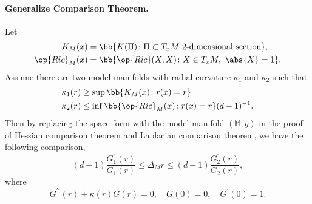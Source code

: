\paragraph{Generalize Comparison Theorem.} Let
\begin{align*}
    K_M(x) &= \bb{K(\Pi) \colon \Pi \subset T_xM ~2\text{-dimensional section}}, \\
    \op{Ric}_M(x) &= \bb{\op{Ric}(X,X) \colon X \in T_xM,~\abs{X} = 1}.
\end{align*}
Assume there are two model manifolds with radial curvature $\kappa_1$ and $\kappa_2$ such that
\begin{align*}
    \kappa_1(r) &\geq \sup\bb{K_M(x) \colon r(x) = r} \\
    \kappa_2(r) &\leq \inf\bb{\op{Ric}_M(x) \colon r(x) = r}(d-1)^{-1}.
\end{align*}
Then by replacing the space form with the model manifold $(\mathbb{M},g)$ in the proof of Hessian comparison theorem and Laplacian comparison theorem, we have the following comparison,
\begin{equation*}
    (d-1) \frac{G_1^{\prime}(r)}{G_1(r)} \leq \Delta_M r \leq(d-1) \frac{G_2^{\prime}(r)}{G_2(r)},
\end{equation*}
where
\begin{equation*}
    G^{\prime \prime}(r)+\kappa(r) G(r)=0, \quad G(0)=0, \quad G^{\prime}(0)=1.
\end{equation*}














































